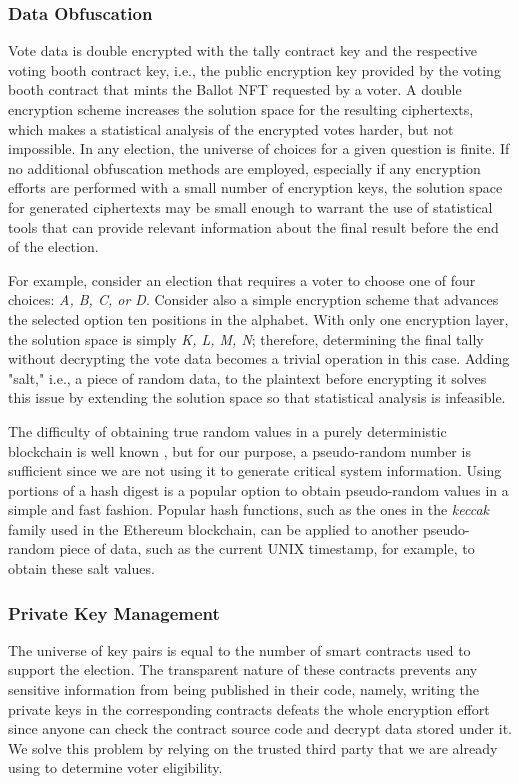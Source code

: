 \documentclass[../main.tex]{subfiles}
\begin{document}
\subsubsection{Data Obfuscation}
\label{sec:data_obfuscation}
Vote data is double encrypted with the tally contract key and the respective voting booth contract key, i.e., the public encryption key provided by the voting booth contract that mints the Ballot NFT requested by a voter. A double encryption scheme increases the solution space for the resulting ciphertexts, which makes a statistical analysis of the encrypted votes harder, but not impossible. In any election, the universe of choices for a given question is finite. If no additional obfuscation methods are employed, especially if any encryption efforts are performed with a small number of encryption keys, the solution space for generated ciphertexts may be small enough to warrant the use of statistical tools that can provide relevant information about the final result before the end of the election.
\par
For example, consider an election that requires a voter to choose one of four choices: \textit{A, B, C, or D}. Consider also a simple encryption scheme that advances the selected option ten positions in the alphabet. With only one encryption layer, the solution space is simply \textit{K, L, M, N}; therefore, determining the final tally without decrypting the vote data becomes a trivial operation in this case. Adding "salt," i.e., a piece of random data, to the plaintext before encrypting it solves this issue by extending the solution space so that statistical analysis is infeasible.
\par
The difficulty of obtaining true random values in a purely deterministic blockchain is well known \cite{Antonopoulos2018}, but for our purpose, a pseudo-random number is sufficient since we are not using it to generate critical system information. Using portions of a hash digest is a popular option to obtain pseudo-random values in a simple and fast fashion. Popular hash functions, such as the ones in the \textit{keccak} family used in the Ethereum blockchain, can be applied to another pseudo-random piece of data, such as the current UNIX timestamp, for example, to obtain these salt values.

\subsubsection{Private Key Management}
The universe of key pairs is equal to the number of smart contracts used to support the election. The transparent nature of these contracts prevents any sensitive information from being published in their code, namely, writing the private keys in the corresponding contracts defeats the whole encryption effort since anyone can check the contract source code and decrypt data stored under it. We solve this problem by relying on the trusted third party that we are already using to determine voter eligibility.
\end{document}

